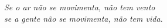 \documentclass[
	12pt,				%
	openright,			%
	twoside,			%
	a4paper,			%
	english,			%
	french,				%
	spanish,			%
	brazil				%
	]{abntex2}
\begin{document}
    
        

      
  

\begin{dedicatoria}
   \vspace*{\fill}
   \centering
   \noindent
   \textit{Se o ar não se movimenta, não tem vento\\
   se a gente não se movimenta, não tem vida.} \vspace*{\fill}
\end{dedicatoria}

\end{document}

